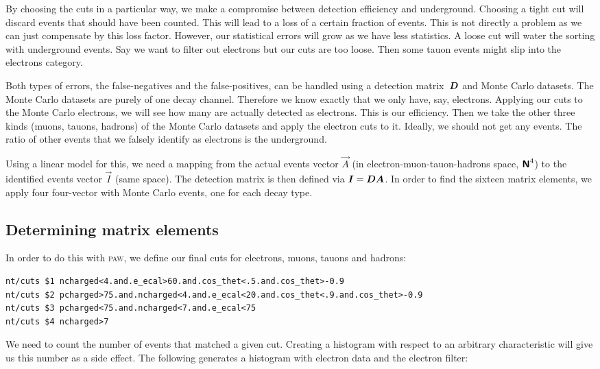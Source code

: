 \documentclass[11pt, english, fleqn, DIV=15, headinclude, BCOR=2cm]{scrreprt}
\begin{document}
By choosing the cuts in a particular way, we make a compromise between
detection efficiency and underground. Choosing a tight cut will discard events
that should have been counted. This will lead to a loss of a certain fraction
of events. This is not directly a problem as we can just compensate by this
loss factor. However, our statistical errors will grow as we have less
statistics. A loose cut will water the sorting with underground events. Say we
want to filter out electrons but our cuts are too loose. Then some tauon events
might slip into the electrons category.

Both types of errors, the false-negatives and the false-positives, can be
handled using a detection matrix~$\mat D$ and Monte Carlo datasets.
The Monte Carlo datasets are purely of one decay channel. Therefore we know
exactly that we only have, say, electrons. Applying our cuts to the Monte Carlo
electrons, we will see how many are actually detected as electrons. This is our
efficiency. Then we take the other three kinds (muons, tauons, hadrons) of the
Monte Carlo datasets and apply the electron cuts to it. Ideally, we should not
get any events. The ratio of other events that we falsely identify as electrons
is the underground.

Using a linear model for this, we need a mapping from the actual events vector
$\vec A$ (in electron-muon-tauon-hadrons space, $\text{\bfseries\sffamily{N}}^4$) to the identified events
vector $\vec I$ (same space). The detection matrix is then defined via $\vec I
= \mat D \vec A$. In order to find the sixteen matrix elements, we apply four
four-vector with Monte Carlo events, one for each decay type.

\subsection{Determining matrix elements}

In order to do this with \textsc{paw}, we define our final cuts for electrons,
muons, tauons and hadrons:

\begin{lstlisting}
nt/cuts $1 ncharged<4.and.e_ecal>60.and.cos_thet<.5.and.cos_thet>-0.9
nt/cuts $2 pcharged>75.and.ncharged<4.and.e_ecal<20.and.cos_thet<.9.and.cos_thet>-0.9
nt/cuts $3 pcharged<75.and.ncharged<7.and.e_ecal<75
nt/cuts $4 ncharged>7
\end{lstlisting}

We need to count the number of events that matched a given cut. Creating a
histogram with respect to an arbitrary characteristic will give us this number
as a side effect. The following generates a histogram with electron data and
the electron filter:
\end{document}
